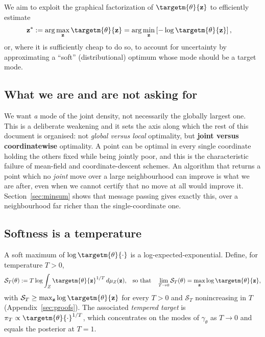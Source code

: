 We aim to exploit the graphical factorization of $\targetm{\theta}{\mathbf{z}}$ to efficiently estimate
\begin{align*}
    \mathbf{z}^{*} &:= \arg \max_{\mathbf{z}} \targetm{\theta}{\mathbf{z}} = \arg \min_{\mathbf{z}} \left[- \log \targetm{\theta}{\mathbf{z}}\right],
\end{align*}
or, where it is sufficiently cheap to do so, to account for uncertainty by approximating a ``soft'' (distributional) optimum whose mode should be a target mode.

\subsection{What we are and are not asking for}
\label{sec:goal}

We want \emph{a} mode of the joint density, not necessarily the globally largest one. This is a deliberate weakening and it sets the axis along which the rest of this document is organised: not \emph{global versus local} optimality, but \textbf{joint versus coordinatewise} optimality. A point can be optimal in every single coordinate holding the others fixed while being jointly poor, and this is the characteristic failure of mean-field and coordinate-descent schemes. An algorithm that returns a point which no \emph{joint} move over a large neighbourhood can improve is what we are after, even when we cannot certify that no move at all would improve it. Section~\ref{sec:minsum} shows that message passing gives exactly this, over a neighbourhood far richer than the single-coordinate one.

\subsection{Softness is a temperature}
\label{sec:softness}

A soft maximum of $\log \targetm{\theta}{\cdot}$ is a log-expected-exponential. Define, for temperature $T > 0$,
\begin{align}
    \label{eq:softmax}
    \mathcal{S}_T(\theta) &:= T \log \int_Z \targetm{\theta}{\mathbf{z}}^{1/T} \, d\mu_Z(\mathbf{z}),
    &\text{so that} \quad \lim_{T \rightarrow 0} \mathcal{S}_T(\theta) = \max_{\mathbf{z}} \log \targetm{\theta}{\mathbf{z}},
\end{align}
with $\mathcal{S}_T \geq \max_{\mathbf{z}} \log \targetm{\theta}{\mathbf{z}}$ for every $T > 0$ and $\mathcal{S}_T$ nonincreasing in $T$ (Appendix~\ref{sec:proofs}). The associated \emph{tempered target} is $\pi_T \propto \targetm{\theta}{\cdot}^{1/T}$, which concentrates on the modes of $\gamma_\theta$ as $T \rightarrow 0$ and equals the posterior at $T = 1$.

